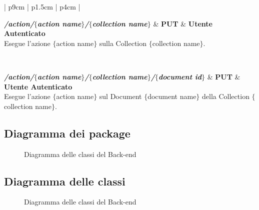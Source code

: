 \begin{center}
\begin{longtable}{| p{9cm} | p{1.5cm} | p{4cm} |}
	 {} \\ \hline
	
	\textbf{\emph{/action/$\{$action name$\}$/$\{$collection name$\}$}} & \textbf{PUT} & \textbf{Utente Autenticato} \\ \hline
	 {Esegue l'azione $\{$action name$\}$ sulla Collection $\{$collection name$\}$.}  \\ 
	\specialrule{1pt}{1pt}{1pt}
	
	 {} \\ \hline
	
	\textbf{\emph{/action/$\{$action name$\}$/$\{$collection name$\}$/$\{$document id$\}$}} & \textbf{PUT} & \textbf{Utente Autenticato} \\ \hline
	 {Esegue l'azione $\{$action name$\}$ sul Document $\{$document name$\}$ della Collection 
	$\{$collection name$\}$.}  \\ 
	\specialrule{1pt}{1pt}{1pt}

	
\end{longtable}
	  \egroup
\end{center}
\subsection{Diagramma dei package}

\begin{figure}[H]
\centering
\caption{Diagramma delle classi del Back-end}
\label{diagrammaClassiBackEnd}
\end{figure}

\subsection{Diagramma delle classi}

\begin{figure}[H]
\centering
\caption{Diagramma delle classi del Back-end}
\label{diagrammaClassiBackEnd}
\end{figure}



